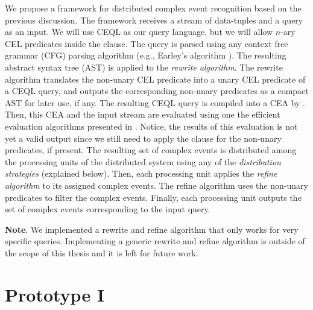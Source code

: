 We propose a framework for distributed complex event recognition based on the previous discussion. The framework receives a stream of data-tuples and a query as an input. We will use CEQL as our query language, but we will allow $n$-ary CEL predicates inside the  clause. The query is parsed using any context free grammar (CFG) parsing algorithm (e.g., Earley's algorithm \cite{earley}). The resulting abstract syntax tree (AST) is applied to the \emph{rewrite algorithm}. The rewrite algorithm translates the non-unary CEL predicate into a unary CEL predicate of a CEQL query, and outputs the corresponding non-unary predicates as a compact AST for later use, if any. The resulting CEQL query is compiled into a CEA by \cite[Theorem~6.2]{formal-framework-cer}. Then, this CEA and the input stream are evaluated using one the efficient evaluation algorithms presented in \cite{formal-framework-cer, core}. Notice, the results of this evaluation is not yet a valid output since we still need to apply the  clause for the non-unary predicates, if present. The resulting set of complex events is distributed among the processing units of the distributed system using any of the \emph{distribution strategies} (explained below). Then, each processing unit applies the \emph{refine algorithm} to its assigned complex events. The refine algorithm uses the non-unary predicates to filter the complex events. Finally, each processing unit outputs the set of complex events corresponding to the input query.

\textbf{Note}. We implemented a rewrite and refine algorithm that only works for very specific queries. Implementing a generic rewrite and refine algorithm is outside of the scope of this thesis and it is left for future work.

\section{Prototype I}\label{sec:prototype:I}

